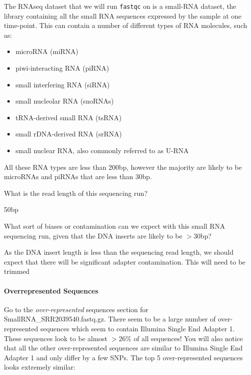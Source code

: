 The RNAseq dataset that we will run \texttt{fastqc} on is a small-RNA dataset, the library containing all the small RNA sequences expressed by the sample at one time-point. This can contain a number of different types of RNA molecules, such as:
\begin{itemize}
\item microRNA (miRNA)
\item piwi-interacting RNA (piRNA)
\item small interfering RNA (siRNA)
\item small nucleolar RNA (snoRNAs)
\item tRNA-derived small RNA (tsRNA)
\item small rDNA-derived RNA (srRNA)
\item small nuclear RNA, also commonly referred to as U-RNA
\end{itemize}

All these RNA types are less than 200bp, however the majority are likely to be microRNAs and piRNAs that are less than 30bp.

\begin{questions}
What is the read length of this sequencing run? \\
\begin{answer}
50bp \\
\end{answer}
What sort of biases or contamination can we expect with this small RNA sequencing run, given that the DNA inserts are likely to be $>30$bp? \\
\begin{answer}
As the DNA insert length is less than the sequencing read length, we should expect that there will be significant adapter contamination. This will need to be trimmed
\end{answer}
\end{questions}

\paragraph{Overrepresented Sequences}
Go to the \textit{over-represented} sequences section for SmallRNA\_SRR2039540.fastq.gz.
There seem to be a large number of over-represented sequences which seem to contain Illumina Single End Adapter 1. These sequences look to be almost $>26$\% of all sequences! You will also notice that all the other over-represented sequences are similar to Illumina Single End Adapter 1 and only differ by a few SNPs. The top 5 over-represented sequences looks extremely similar: \\

